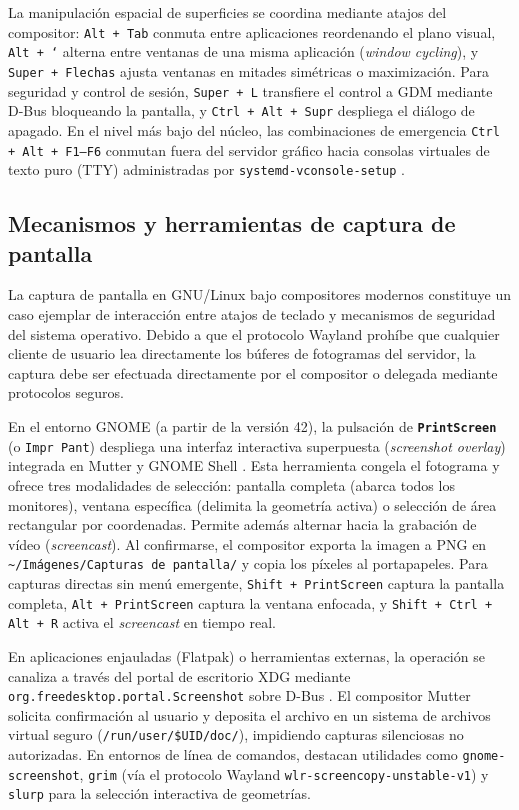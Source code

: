 \documentclass[12pt]{article}
\begin{document}
La manipulación espacial de superficies se coordina mediante atajos del compositor: \texttt{Alt + Tab} conmuta entre aplicaciones reordenando el plano visual, \texttt{Alt + `} alterna entre ventanas de una misma aplicación (\textit{window cycling}), y \texttt{Super + Flechas} ajusta ventanas en mitades simétricas o maximización. Para seguridad y control de sesión, \texttt{Super + L} transfiere el control a GDM mediante D-Bus bloqueando la pantalla, y \texttt{Ctrl + Alt + Supr} despliega el diálogo de apagado. En el nivel más bajo del núcleo, las combinaciones de emergencia \texttt{Ctrl + Alt + F1--F6} conmutan fuera del servidor gráfico hacia consolas virtuales de texto puro (TTY) administradas por \texttt{systemd-vconsole-setup} \parencite[\S 7.8, p.\ 399]{carretero2001sistemas}.

\subsection{Mecanismos y herramientas de captura de pantalla}
\label{subsec:mecanismosCapturaPantalla}

La captura de pantalla en GNU/Linux bajo compositores modernos constituye un caso ejemplar de interacción entre atajos de teclado y mecanismos de seguridad del sistema operativo. Debido a que el protocolo Wayland prohíbe que cualquier cliente de usuario lea directamente los búferes de fotogramas del servidor, la captura debe ser efectuada directamente por el compositor o delegada mediante protocolos seguros.

En el entorno GNOME (a partir de la versión 42), la pulsación de \textbf{\texttt{PrintScreen}} (o \texttt{Impr Pant}) despliega una interfaz interactiva superpuesta (\textit{screenshot overlay}) integrada en Mutter y GNOME Shell \parencite{gnomeShellShortcuts}. Esta herramienta congela el fotograma y ofrece tres modalidades de selección: pantalla completa (abarca todos los monitores), ventana específica (delimita la geometría activa) o selección de área rectangular por coordenadas. Permite además alternar hacia la grabación de vídeo (\textit{screencast}). Al confirmarse, el compositor exporta la imagen a PNG en \texttt{\textasciitilde/Imágenes/Capturas de pantalla/} y copia los píxeles al portapapeles. Para capturas directas sin menú emergente, \texttt{Shift + PrintScreen} captura la pantalla completa, \texttt{Alt + PrintScreen} captura la ventana enfocada, y \texttt{Shift + Ctrl + Alt + R} activa el \textit{screencast} en tiempo real.

En aplicaciones enjauladas (Flatpak) o herramientas externas, la operación se canaliza a través del portal de escritorio XDG mediante \nolinkurl{org.freedesktop.portal.Screenshot} sobre D-Bus \parencite{freedesktopScreenshotPortal}. El compositor Mutter solicita confirmación al usuario y deposita el archivo en un sistema de archivos virtual seguro (\texttt{/run/user/\$UID/doc/}), impidiendo capturas silenciosas no autorizadas. En entornos de línea de comandos, destacan utilidades como \texttt{gnome-screenshot}, \texttt{grim} (vía el protocolo Wayland \texttt{wlr-screencopy-unstable-v1}) y \texttt{slurp} para la selección interactiva de geometrías.
\end{document}
